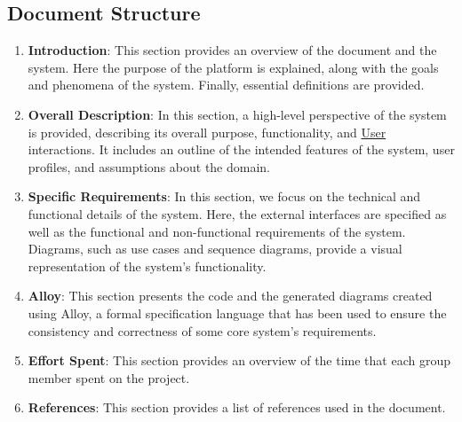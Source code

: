 \subsection{Document Structure}
\begin{enumerate}
    \item \textcolor{titleColor}{\textbf{Introduction}}: This section provides an overview of the document and the system. Here the purpose of the platform is explained, along with the goals and phenomena of the system. Finally, essential definitions are provided.
    \item \textcolor{titleColor}{\textbf{Overall Description}}: In this section, a high-level perspective of the system is provided, describing its overall purpose, functionality, and \hyperref[def:user]{User} interactions. It includes an outline of the intended features of the system, user profiles, and assumptions about the domain.
    \item \textcolor{titleColor}{\textbf{Specific Requirements}}: In this section, we focus on the technical and functional details of the system. Here, the external interfaces are specified as well as the functional and non-functional requirements of the system. Diagrams, such as use cases and sequence diagrams, provide a visual representation of the system's functionality.
    \item \textcolor{titleColor}{\textbf{Alloy}}: This section presents the code and the generated diagrams created using Alloy, a formal specification language that has been used to ensure the consistency and correctness of some core system's requirements.
    \item \textcolor{titleColor}{\textbf{Effort Spent}}: This section provides an overview of the time that each group member spent on the project.
    \item \textcolor{titleColor}{\textbf{References}}: This section provides a list of references used in the document.
\end{enumerate}